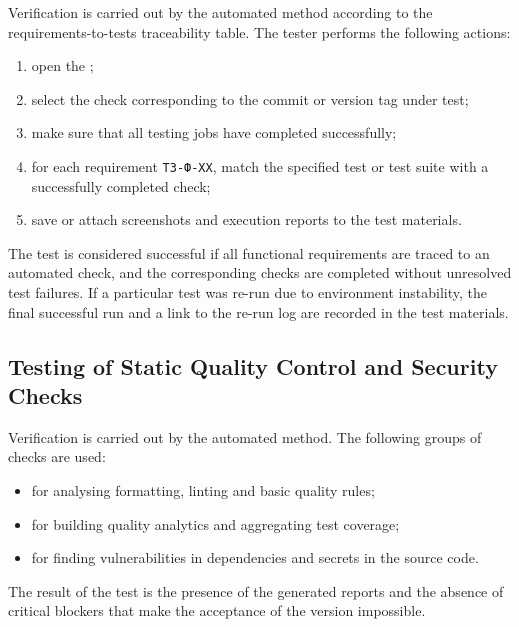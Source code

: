 \documentclass[12pt,a4paper]{extarticle}
\begin{document}
\begin{hseExample}
Verification is carried out by the automated method according to the requirements-to-tests traceability table. The tester performs the following actions:

\begin{enumerate}[label=\arabic*), leftmargin=1.25cm]
    \item open the ;
    \item select the check corresponding to the commit or version tag under test;
    \item make sure that all testing jobs have completed successfully;
    \item for each requirement \texttt{ТЗ-Ф-XX}, match the specified test or test suite with a successfully completed check;
    \item save or attach screenshots and execution reports to the test materials.
\end{enumerate}

The test is considered successful if all functional requirements are traced to an automated check, and the corresponding checks are completed without unresolved test failures. If a particular test was re-run due to environment instability, the final successful run and a link to the re-run log are recorded in the test materials.
\end{hseExample}

\subsection{Testing of Static Quality Control and Security Checks}

\begin{hseExample}
Verification is carried out by the automated method. The following groups of checks are used:

\begin{itemize}[leftmargin=1.25cm]
    \item {} for analysing formatting, linting and basic quality rules;
    \item {} for building quality analytics and aggregating test coverage;
    \item {} for finding vulnerabilities in dependencies and secrets in the source code.
\end{itemize}

The result of the test is the presence of the generated reports and the absence of critical blockers that make the acceptance of the version impossible.
\end{hseExample}
\end{document}
